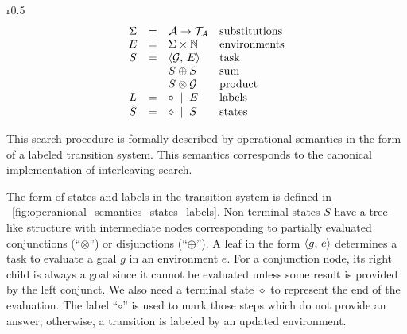 \begin{wrapfigure}{r}{0.5\textwidth}
\setlength{\abovecaptionskip}{0pt plus 3pt minus 2pt}
\[
\begin{array}{ccll}
  \Sigma & = & \mathcal{A} \to \mathcal{T}_\mathcal{A} & \mbox{substitutions}\\ 
  E & = & \Sigma \times \mathbb{N}              & \mbox{environments} \\
  S & = & \langle \mathcal{G} ,\, E \rangle & \mbox{task} \\
    &   & S \oplus S              & \mbox{sum} \\
    &   & S \otimes \mathcal{G}   & \mbox{product} \\
  L & = & \circ \; \mid \; E      & \mbox{labels}\\
  \hat{S} & = & \diamond \; \mid \; S   & \mbox{states} 
\end{array}
\]
\caption{States and labels in the LTS for \mK}
\label{fig:operanional_semantics_states_labels}
\end{wrapfigure}

This search procedure is formally described by operational semantics in the form of a labeled transition system.
This semantics corresponds to the canonical implementation of interleaving search. 

The form of states and labels in the transition system is defined in \figureword~\ref{fig:operanional_semantics_states_labels}.
Non-terminal states $S$ have a tree-like structure with intermediate nodes corresponding to partially evaluated conjunctions
(``$\otimes$'') or disjunctions (``$\oplus$'').
A leaf in the form $\langle g ,\, e \rangle$ determines a task to evaluate a goal $g$ in an environment $e$. For a conjunction node, its right child
is always a goal since it cannot be evaluated unless some result is provided by the left conjunct.
We also need a terminal state $\diamond$ to represent the end of the evaluation.
The label ``$\circ$'' is used to mark those steps which do not provide an answer; otherwise, a transition is labeled by an updated
environment.


